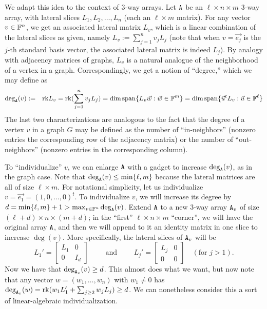 We adapt this idea to the context of 3-way arrays. 
Let 
$\mathtt{A}$ 
be an $\ell \times n \times m$ 3-way array, with lateral slices $L_1, L_2, \dotsc, 
L_n$ (each an $\ell \times m$ matrix). 
For any vector $v \in \mathbb{F}^n$, we get an associated lateral matrix $L_v$, which is a linear combination of the lateral slices as given, namely $L_v := \sum_{j=1}^n v_j L_j$ (note that when $v=\vec{e_j}$ is the $j$-th standard basis vector, the associated lateral matrix is indeed $L_j$). By analogy with adjacency matrices of graphs, $L_v$ is a natural analogue of the neighborhood of a vertex in a graph. Correspondingly, we get a notion of ``degree,'' which we may define as
\begin{eqnarray*}
\deg_{\mathtt{A}}(v) & := & \mathrm{rk} L_v = \mathrm{rk} (\sum_{j=1}^n v_j L_j) 
=  \dim \mathrm{span}\{L_v \vec{w} : \vec{w} \in \mathbb{F}^m \} 
= \dim \mathrm{span}\{\vec{u}^t L_v : \vec{u} \in \mathbb{F}^\ell \}
\end{eqnarray*}
The last two characterizations are analogous to the fact that the degree of a vertex $v$ in a graph $G$ may be defined as the number of ``in-neighbors'' (nonzero entries the corresponding row of the adjacency matrix) or the number of ``out-neighbors'' (nonzero entries in the corresponding column). 

To ``individualize'' $v$, 
we can enlarge $\mathtt{A}$ with a gadget to increase $\deg_{\mathtt{A}}(v)$, as in the graph case. Note that $\deg_{\mathtt{A}}(v) \leq \min\{\ell,m\}$ because the lateral matrices are all of size $\ell \times m$. For notational simplicity, let us individualize $v = \vec{e_1} = (1,0,\dotsc,0)^t$. To individualize $v$, we will increase its degree by $d = \min\{\ell,m\}+1 > \max_{v \in \mathbb{F}^n} \deg_{\mathtt{A}} (v)$. Extend $\mathtt{A}$ to a new 3-way array $\mathtt{A}_v$ of size $(\ell+d) \times n \times (m+d)$; in the ``first'' $\ell \times n \times m$ ``corner'', we will have the original array $\mathtt{A}$, and then we will append to it an identity matrix in one slice to increase $\deg(v)$. More specifically, the lateral slices of $\mathtt{A}_v$ will be 
\[
L_1' = \begin{bmatrix} L_1 & 0 \\ 0 & I_d \end{bmatrix} \qquad \text{ and } \qquad L_j' = \begin{bmatrix} L_j & 0 \\ 0 & 0 \end{bmatrix} \quad ( \text{for } j > 1).
\]
Now we have that $\deg_{\mathtt{A}_v}(v) \geq d$. This almost does what we want, but now note that any vector $w=(w_1,\dotsc,w_n)$ with $w_1 \neq 0$ has $\deg_{\mathtt{A}_v}(w) =\mathrm{rk} (w_1 L_1' + \sum_{j \geq 2} w_j L_j) \geq d$. We can nonetheless consider this a sort of linear-algebraic individualization.


